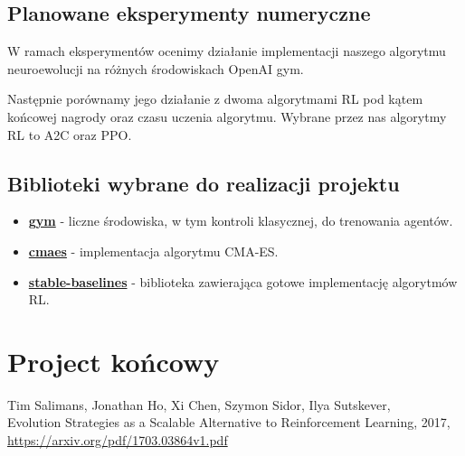 \documentclass[12pt,a4paper]{article}
\begin{document}
\subsection{Planowane eksperymenty numeryczne}

W ramach eksperymentów ocenimy działanie implementacji naszego algorytmu
neuroewolucji na różnych środowiskach OpenAI gym.

Następnie porównamy jego działanie z dwoma algorytmami RL pod kątem
końcowej nagrody oraz czasu uczenia algorytmu. Wybrane przez nas
algorytmy RL to A2C oraz PPO.


\subsection{Biblioteki wybrane do realizacji projektu}

\begin{itemize}
  \item \textbf{\href{https://github.com/openai/gym}{gym}} - liczne środowiska, w tym kontroli klasycznej,
        do trenowania agentów.
  \item \textbf{\href{https://github.com/CyberAgentAILab/cmaes}{cmaes}} -
        implementacja algorytmu CMA-ES.
  \item \textbf{\href{https://github.com/DLR-RM/stable-baselines3}{stable-baselines}} -
        biblioteka zawierająca gotowe implementację algorytmów RL.
\end{itemize}

\section{Project końcowy}

\begin{thebibliography}{9}
  Tim Salimans, Jonathan Ho, Xi Chen, Szymon Sidor, Ilya Sutskever,\\
  Evolution Strategies as a Scalable Alternative to Reinforcement Learning,
  2017, \href{https://arxiv.org/pdf/1703.03864v1.pdf}{https://arxiv.org/pdf/1703.03864v1.pdf}

\end{thebibliography}
\end{document}
